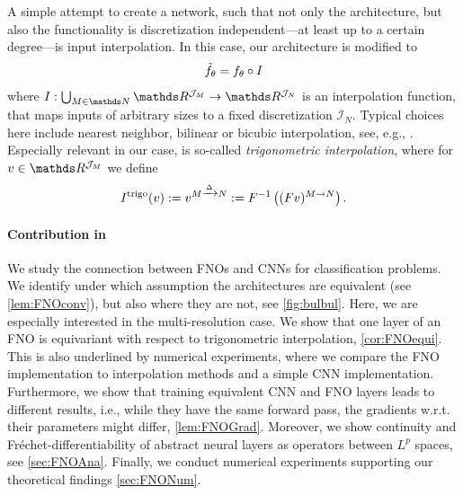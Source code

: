 A simple attempt to create a network, such that not only the architecture, but also the functionality is discretization independent---at least up to a certain degree---is input interpolation. In this case, our architecture is modified to
%
\begin{align*}
\tilde {f}_\theta = f_\theta \circ I
\end{align*}
%
where $I:\bigcup_{M\in\N} \R^{\mathcal{J}_M} \to \R^{\mathcal{J}_N}$ is an interpolation function, that maps inputs of arbitrary sizes to a fixed discretization $\mathcal{I}_N$. Typical choices here include nearest neighbor, bilinear or bicubic interpolation, see, e.g., \cite{gonzales1987digital}. Especially relevant in our case, is so-called \emph{trigonometric interpolation}, where for $\imgg\in\R^{\mathcal{J}_M}$ we define
%
%
\begin{align*}
I^{\text{trigo}}(v) := v^{M \xrightarrow{\Delta} N} := F^{-1} \left( (Fv)^{M \rightarrow N}\right).
\end{align*}
%
%
\paragraph{Contribution in \cite{kabri2023resolution}} We study the connection between FNOs and CNNs for classification problems. We identify under which assumption the architectures are equivalent (see \cref{lem:FNOconv}), but also where they are not, see \cref{fig:bulbul}. Here, we are especially interested in the multi-resolution case. We show that one layer of an FNO is equivariant with respect to trigonometric interpolation, \cref{cor:FNOequi}. This is also underlined by numerical experiments, where we compare the FNO implementation to interpolation methods and a simple CNN implementation. Furthermore, we show that training equivalent CNN and FNO layers leads to different results, i.e., while they have the same forward pass, the gradients w.r.t. their parameters might differ, \cref{lem:FNOGrad}. Moreover, we show continuity and Fréchet-differentiability of abstract neural layers as operators between $L^p$ spaces, see \cref{sec:FNOAna}. Finally, we conduct numerical experiments supporting our theoretical findings \cref{sec:FNONum}.
%
%

%
%

